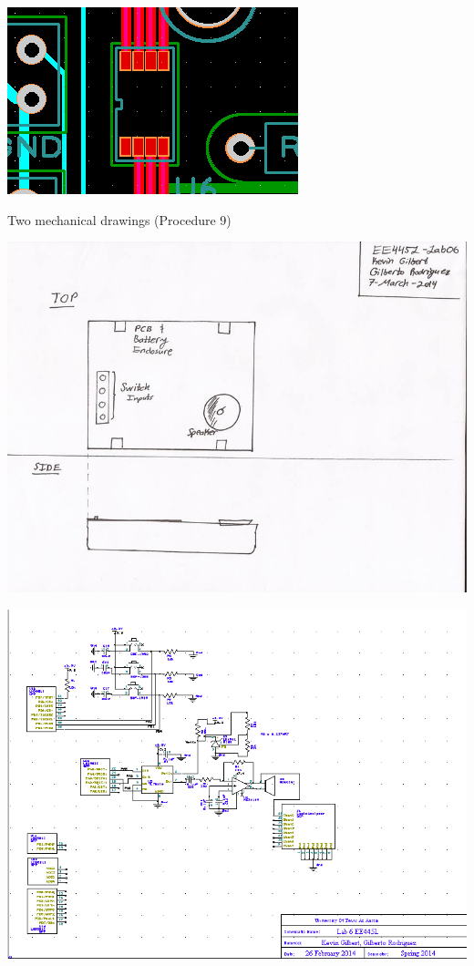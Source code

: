 \documentclass[twoside]{article}
\begin{document}
\centerline{\includegraphics[width=\textwidth]{Foot3}}
 Two mechanical drawings (Procedure 9)\\ 
\centerline{\includegraphics[width=\textwidth]{Lab06_mockup}}
\centerline{\includegraphics[width=\textwidth]{Circuit}}
\end{document}
